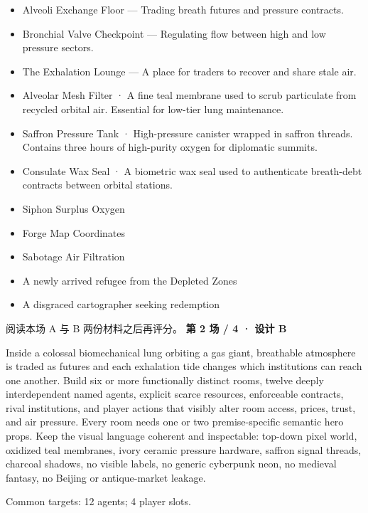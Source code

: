 \documentclass[10pt,a4paper]{article}
\newcommand{\heading}[1]{\par\vspace{5pt}{\color{teal}\bfseries #1}\par}
\begin{document}
\begin{minipage}[t]{0.48\linewidth}\fontsize{9}{12}\selectfont\raggedright\setlength{\parskip}{0pt}
\heading{地点与用途}\begin{itemize}
\item Alveoli Exchange Floor — Trading breath futures and pressure contracts.
\item Bronchial Valve Checkpoint — Regulating flow between high and low pressure sectors.
\item The Exhalation Lounge — A place for traders to recover and share stale air.
\end{itemize}
\heading{物件}\begin{itemize}
\item Alveolar Mesh Filter · A fine teal membrane used to scrub particulate from recycled orbital air. Essential for low-tier lung maintenance.
\item Saffron Pressure Tank · High-pressure canister wrapped in saffron threads. Contains three hours of high-purity oxygen for diplomatic summits.
\item Consulate Wax Seal · A biometric wax seal used to authenticate breath-debt contracts between orbital stations.
\end{itemize}
\heading{可能采取的行动}\begin{itemize}
\item Siphon Surplus Oxygen
\item Forge Map Coordinates
\item Sabotage Air Filtration
\end{itemize}
\heading{玩家进入方式}\begin{itemize}
\item A newly arrived refugee from the Depleted Zones
\item A disgraced cartographer seeking redemption
\end{itemize}
\end{minipage}
\vfill\small 阅读本场 A 与 B 两份材料之后再评分。
\clearpage
{\Large\bfseries 第 2 场 / 4 · 设计 B}\par
\heading{共同生成要求}
{\small Inside a colossal biomechanical lung orbiting a gas giant, breathable atmosphere is traded as futures and each exhalation tide changes which institutions can reach one another. Build six or more functionally distinct rooms, twelve deeply interdependent named agents, explicit scarce resources, enforceable contracts, rival institutions, and player actions that visibly alter room access, prices, trust, and air pressure. Every room needs one or two premise-specific semantic hero props. Keep the visual language coherent and inspectable: top-down pixel world, oxidized teal membranes, ivory ceramic pressure hardware, saffron signal threads, charcoal shadows, no visible labels, no generic cyberpunk neon, no medieval fantasy, no Beijing or antique-market leakage.

Common targets: 12 agents; 4 player slots.}\par\vspace{6pt}
\end{document}

